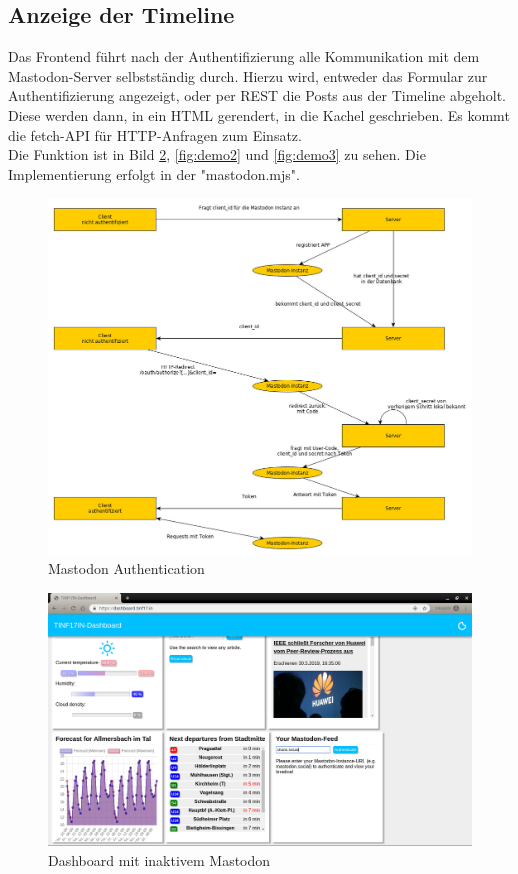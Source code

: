 \documentclass[fleqn,10pt]{SelfArx} %
\begin{document}
\subsection{Anzeige der Timeline}
Das Frontend führt nach der Authentifizierung alle Kommunikation mit dem Mastodon-Server selbstständig durch. Hierzu wird, entweder das Formular zur Authentifizierung angezeigt, oder per REST die Posts aus der Timeline abgeholt. Diese werden dann, in ein HTML gerendert, in die Kachel geschrieben. Es kommt die fetch-API für HTTP-Anfragen zum Einsatz. \\
Die Funktion ist in Bild \ref{fig:demo1}, \ref{fig:demo2} und \ref{fig:demo3} zu sehen. Die Implementierung erfolgt in der "mastodon.mjs".
\begin{figure}
\includegraphics[width=\linewidth]{mastodon.jpg}
\caption{Mastodon Authentication}
\label{fig:mastodon1}
\end{figure}
\begin{figure}
	\includegraphics[width=\linewidth]{images/1.png}
	\caption{Dashboard mit inaktivem Mastodon}
	\label{fig:demo1}
\end{figure}
\end{document}
